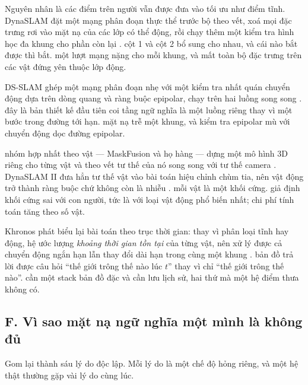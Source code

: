 \documentclass[../../deep_learning.tex]{subfiles}
\begin{document}
\begin{mach}
\item {} Nguyên nhân là các điểm trên người vẫn được đưa vào tối ưu như điểm tĩnh. \gp DynaSLAM đặt một mạng phân đoạn thực thể trước bộ theo vết, xoá mọi đặc trưng rơi vào mặt nạ của các lớp có thể động, rồi chạy thêm một kiểm tra hình học đa khung cho phần còn lại \cite{bescos2018dynaslam}. \gd cột 1 và cột 2 bổ sung cho nhau, và cái nào bắt được thì bắt. \gia một lượt mạng nặng cho mỗi khung, và mất toàn bộ đặc trưng trên các vật đứng yên thuộc lớp động.
\item {} \gp DS-SLAM ghép một mạng phân đoạn nhẹ với một kiểm tra nhất quán chuyển động dựa trên dòng quang và ràng buộc epipolar, chạy trên hai luồng song song \cite{yu2018dsslam}. \hq đây là bản thiết kế đầu tiên coi tầng ngữ nghĩa là một luồng riêng thay vì một bước trong đường tới hạn. \gia mặt nạ trễ một khung, và kiểm tra epipolar mù với chuyển động dọc đường epipolar.
\item {} \gp nhóm hợp nhất theo vật --- MaskFusion và họ hàng --- dựng một mô hình 3D riêng cho từng vật và theo vết tư thế của nó song song với tư thế camera \cite{runz2018maskfusion}. DynaSLAM II đưa hẳn tư thế vật vào bài toán hiệu chỉnh chùm tia, nên vật động trở thành ràng buộc chứ không còn là nhiễu \cite{bescos2021dynaslam2}. \gd mỗi vật là một khối cứng. \gia giả định khối cứng sai với con người, tức là với loại vật động phổ biến nhất; chi phí tính toán tăng theo số vật.
\item {} \gp Khronos phát biểu lại bài toán theo trục thời gian: thay vì phân loại tĩnh hay động, hệ ước lượng \emph{khoảng thời gian tồn tại} của từng vật, nên xử lý được cả chuyển động ngắn hạn lẫn thay đổi dài hạn trong cùng một khung \cite{schmid2024khronos}. \hq bản đồ trả lời được câu hỏi ``thế giới trông thế nào lúc \(t\)'' thay vì chỉ ``thế giới trông thế nào''. \gia cần một stack bản đồ đặc và cần lưu lịch sử, hai thứ mà một hệ điểm thưa không có.
\end{mach}

\subsection{F. Vì sao mặt nạ ngữ nghĩa một mình là không đủ}
Gom lại thành sáu lý do độc lập. Mỗi lý do là một chế độ hỏng riêng, và một hệ thật thường gặp vài lý do cùng lúc.
\end{document}
